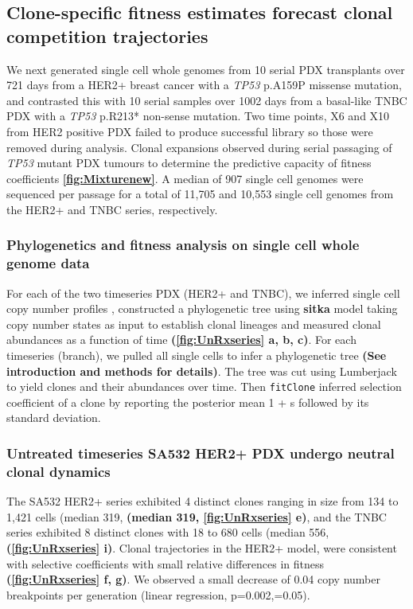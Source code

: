 \subsection{Clone-specific fitness estimates forecast clonal competition trajectories} 
 
 We next generated single cell whole genomes from 10 serial PDX transplants over 721 days from a HER2+ breast cancer with a \textit{TP53} p.A159P missense mutation, and contrasted this with 10 serial samples over 1002 days from a basal-like \ac{TNBC} PDX with a \textit{TP53} p.R213* non-sense mutation. Two time points, X6 and X10 from HER2 positive PDX failed to produce successful library so those were removed during analysis. Clonal expansions observed during serial passaging of \textit{TP53} mutant PDX tumours to determine the predictive capacity of fitness coefficients \textbf{\autoref{fig:Mixturenew}}.
A median of 907 single cell genomes were sequenced per passage for a total of 11,705 and 10,553 single cell genomes from the HER2+ and TNBC series, respectively. 


\subsubsection{Phylogenetics and fitness analysis on single cell whole genome data}
For each of the two timeseries PDX (HER2+ and TNBC), we inferred single cell copy number profiles , constructed a phylogenetic tree using \textbf{sitka} model taking copy number states as input to establish clonal lineages and measured clonal abundances as a function of time \textbf{(\autoref{fig:UnRxseries} a, b, c)}. For each timeseries (branch), we pulled all single cells to infer a phylogenetic tree \textbf{(See introduction and methods for details)}. The tree was cut using Lumberjack to yield clones and their abundances over time. Then \texttt{fitClone} inferred selection coefficient of a clone by reporting the posterior mean 1 + s followed by its standard deviation.

\subsubsection{Untreated timeseries SA532 HER2+ PDX undergo neutral clonal dynamics}

 The SA532 HER2+ series exhibited 4 distinct clones ranging in size from 134 to 1,421 cells (median 319, \textbf{(median 319, \autoref{fig:UnRxseries} e)}, and the TNBC series exhibited 8 distinct clones with 18 to 680 cells (median 556, \textbf{(\autoref{fig:UnRxseries} i)}. Clonal trajectories in the HER2+ model, were consistent with selective coefficients with small relative differences in fitness \textbf{(\autoref{fig:UnRxseries} f, g)}.
 We observed a small decrease of 0.04 copy number breakpoints per generation (linear regression, p=0.002,=0.05). 

